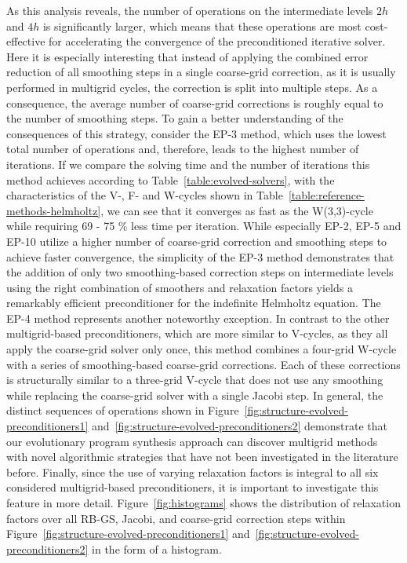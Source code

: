 As this analysis reveals, the number of operations on the intermediate levels $2h$ and $4h$ is significantly larger, which means that these operations are most cost-effective for accelerating the convergence of the preconditioned iterative solver.
Here it is especially interesting that instead of applying the combined error reduction of all smoothing steps in a single coarse-grid correction, as it is usually performed in multigrid cycles, the correction is split into multiple steps.
As a consequence, the average number of coarse-grid corrections is roughly equal to the number of smoothing steps.
To gain a better understanding of the consequences of this strategy, consider the EP-3 method, which uses the lowest total number of operations and, therefore, leads to the highest number of iterations.
If we compare the solving time and the number of iterations this method achieves according to Table~\ref{table:evolved-solvers}, with the characteristics of the V-, F- and W-cycles shown in Table~\ref{table:reference-methods-helmholtz}, we can see that it converges as fast as the W(3,3)-cycle while requiring 69 - 75 \% less time per iteration.
While especially EP-2, EP-5 and EP-10 utilize a higher number of coarse-grid correction and smoothing steps to achieve faster convergence, the simplicity of the EP-3 method demonstrates that the addition of only two smoothing-based correction steps on intermediate levels using the right combination of smoothers and relaxation factors yields a remarkably efficient preconditioner for the indefinite Helmholtz equation.
The EP-4 method represents another noteworthy exception. 
In contrast to the other multigrid-based preconditioners, which are more similar to V-cycles, as they all apply the coarse-grid solver only once, this method combines a four-grid W-cycle with a series of smoothing-based coarse-grid corrections.
Each of these corrections is structurally similar to a three-grid V-cycle that does not use any smoothing while replacing the coarse-grid solver with a single Jacobi step.
In general, the distinct sequences of operations shown in Figure~\ref{fig:structure-evolved-preconditioners1} and~\ref{fig:structure-evolved-preconditioners2} demonstrate that our evolutionary program synthesis approach can discover multigrid methods with novel algorithmic strategies that have not been investigated in the literature before.
Finally, since the use of varying relaxation factors is integral to all six considered multigrid-based preconditioners, it is important to investigate this feature in more detail. 
Figure~\ref{fig:histograms} shows the distribution of relaxation factors over all RB-GS, Jacobi, and coarse-grid correction steps within Figure~\ref{fig:structure-evolved-preconditioners1} and~\ref{fig:structure-evolved-preconditioners2} in the form of a histogram.
